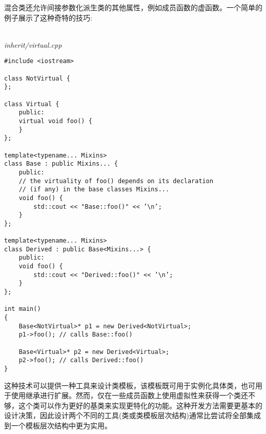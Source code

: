 混合类还允许间接参数化派生类的其他属性，例如成员函数的虚函数。一个简单的例子展示了这种奇特的技巧:

\hspace*{\fill} \\ %
\noindent
\textit{inherit/virtual.cpp}
\begin{lstlisting}[style=styleCXX]
#include <iostream>

class NotVirtual {
};

class Virtual {
	public:
	virtual void foo() {
	}
};

template<typename... Mixins>
class Base : public Mixins... {
	public:
	// the virtuality of foo() depends on its declaration
	// (if any) in the base classes Mixins...
	void foo() {
		std::cout << "Base::foo()" << ’\n’;
	}
};

template<typename... Mixins>
class Derived : public Base<Mixins...> {
	public:
	void foo() {
		std::cout << "Derived::foo()" << ’\n’;
	}
};

int main()
{
	Base<NotVirtual>* p1 = new Derived<NotVirtual>;
	p1->foo(); // calls Base::foo()
	
	Base<Virtual>* p2 = new Derived<Virtual>;
	p2->foo(); // calls Derived::foo()
}
\end{lstlisting}

这种技术可以提供一种工具来设计类模板，该模板既可用于实例化具体类，也可用于使用继承进行扩展。然而，仅在一些成员函数上使用虚拟性来获得一个类还不够，这个类可以作为更好的基类来实现更特化的功能。这种开发方法需要更基本的设计决策，因此设计两个不同的工具(类或类模板层次结构)通常比尝试将全部集成到一个模板层次结构中更为实用。






